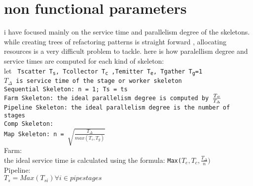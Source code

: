 \documentclass[12pt]{report}
\begin{document}
\section{non functional parameters}
i have focused mainly on the service time and parallelism degree of the skeletons. 
while creating trees of refactoring patterns is straight forward , allocating resources is a very difficult problem to tackle. here is how  paralellism degree and service times are computed for each kind of skeleton:\\
	let \texttt{ Tscatter 	T\textsubscript{s}, 					Tcollector T\textsubscript{c} ,Temitter T\textsubscript{e}, Tgather T\textsubscript{g}=1\\
	$T_{\Delta}$ is service time of the stage or worker skeleton\\
	Sequential Skeleton:	n = 1; Ts = ts\\
	Farm Skeleton:	the ideal parallelism degree is computed by $\frac{T\textsubscript{e}}{T_{\Delta}}$\\
	Pipeline Skeleton: the ideal parallelism degree is the number of stages\\
	Comp Skeleton:\\
     Map Skeleton:  n = $\sqrt{\frac{T_{\Delta}}{max(T_s, T_g)}}$}\\
Farm:\\
	the ideal service time is calculated using the formula: \texttt {Max($T_e,T_c,\frac{T_\Delta}{n})$}\\
Pipeline:\\
	\texttt{$T_s = Max(T_{si}) \forall i \in pipe stages$}
\end{document}
